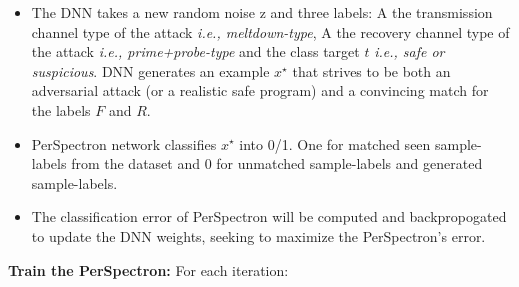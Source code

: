 \begin{itemize}  [topsep=0pt,parsep=0pt,partopsep=0pt, label={--}, leftmargin=*] %
\item  The DNN takes a new random noise z and three labels: A the transmission channel type of the attack {\em i.e., meltdown-type}, A the recovery channel type of the attack {\em i.e., prime+probe-type} and the class target $t$ {\em i.e., safe or suspicious}. DNN generates an example $x^{\star}$ that strives to be both an adversarial attack (or a realistic safe program) and a convincing match for the labels $F$ and $R$.  

\item PerSpectron network classifies $x^{\star}$ into 0/1. One for matched seen sample-labels from the dataset and 0 for unmatched sample-labels and generated sample-labels.    


\item  The classification error of PerSpectron will be computed and backpropogated to update the DNN weights, seeking to maximize the PerSpectron's error. 

\end{itemize}


\noindent\textbf{Train the PerSpectron:}
For each iteration:

